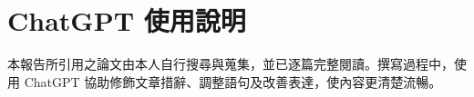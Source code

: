 \chapter*{ChatGPT 使用說明}

本報告所引用之論文由本人自行搜尋與蒐集，並已逐篇完整閱讀。撰寫過程中，使用 ChatGPT 協助修飾文章措辭、調整語句及改善表達，使內容更清楚流暢。
